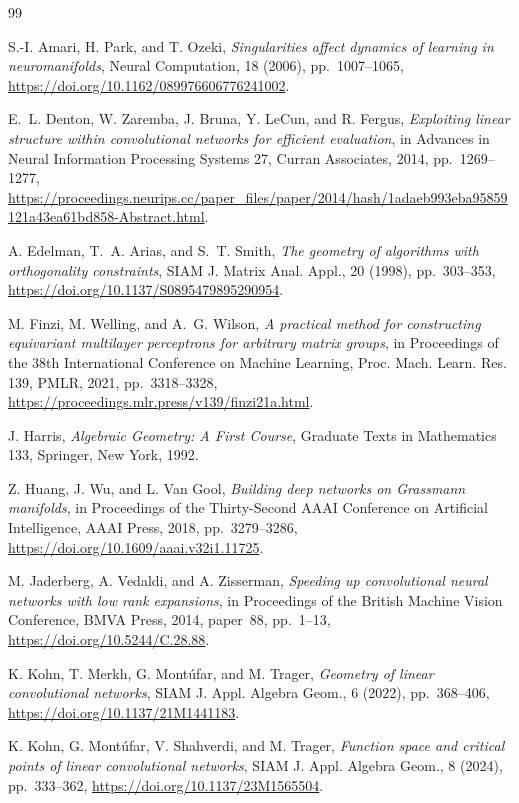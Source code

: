 \documentclass{siamonline250211}
\begin{document}
\begin{thebibliography}{99}

S.-I. Amari, H. Park, and T. Ozeki,
\emph{Singularities affect dynamics of learning in neuromanifolds},
Neural Computation, 18 (2006), pp.~1007--1065,
\url{https://doi.org/10.1162/089976606776241002}.

E.~L. Denton, W. Zaremba, J. Bruna, Y. LeCun, and R. Fergus,
\emph{Exploiting linear structure within convolutional networks for efficient
evaluation}, in Advances in Neural Information Processing Systems 27,
Curran Associates, 2014, pp.~1269--1277,
\url{https://proceedings.neurips.cc/paper_files/paper/2014/hash/1adaeb993eba95859121a43ea61bd858-Abstract.html}.

A. Edelman, T.~A. Arias, and S.~T. Smith,
\emph{The geometry of algorithms with orthogonality constraints},
SIAM J. Matrix Anal. Appl., 20 (1998), pp.~303--353,
\url{https://doi.org/10.1137/S0895479895290954}.

M. Finzi, M. Welling, and A.~G. Wilson,
\emph{A practical method for constructing equivariant multilayer perceptrons
for arbitrary matrix groups}, in Proceedings of the 38th International
Conference on Machine Learning, Proc. Mach. Learn. Res. 139, PMLR, 2021,
pp.~3318--3328,
\url{https://proceedings.mlr.press/v139/finzi21a.html}.

J. Harris,
\emph{Algebraic Geometry: A First Course},
Graduate Texts in Mathematics 133, Springer, New York, 1992.

Z. Huang, J. Wu, and L. Van Gool,
\emph{Building deep networks on Grassmann manifolds},
in Proceedings of the Thirty-Second AAAI Conference on Artificial
Intelligence, AAAI Press, 2018, pp.~3279--3286,
\url{https://doi.org/10.1609/aaai.v32i1.11725}.

M. Jaderberg, A. Vedaldi, and A. Zisserman,
\emph{Speeding up convolutional neural networks with low rank expansions},
in Proceedings of the British Machine Vision Conference, BMVA Press, 2014,
paper~88, pp.~1--13,
\url{https://doi.org/10.5244/C.28.88}.

K. Kohn, T. Merkh, G. Mont\'ufar, and M. Trager,
\emph{Geometry of linear convolutional networks},
SIAM J. Appl. Algebra Geom., 6 (2022), pp.~368--406,
\url{https://doi.org/10.1137/21M1441183}.

K. Kohn, G. Mont\'ufar, V. Shahverdi, and M. Trager,
\emph{Function space and critical points of linear convolutional networks},
SIAM J. Appl. Algebra Geom., 8 (2024), pp.~333--362,
\url{https://doi.org/10.1137/23M1565504}.


\end{thebibliography}
\end{document}
